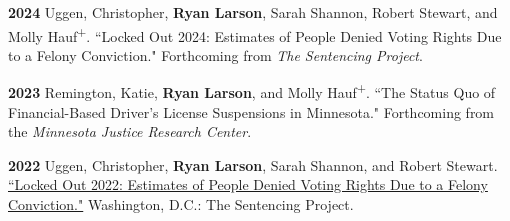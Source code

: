 \documentclass[letterpaper]{article}
\newenvironment{publist}{%
  \begin{list}{}{%
    \setlength{\leftmargin}{0cm}   %
    \setlength{\labelwidth}{2cm}     %
    \setlength{\labelsep}{0.5cm}     %
  }%
}{%
  \end{list}%
}
\renewenvironment{itemize}{
  \begin{list}{}{
    \setlength{\leftmargin}{1.5em}
  }
}{
  \end{list}
}
\begin{document}
\begin{publist}

\item[\textbf{2024}] Uggen, Christopher, \textbf{Ryan Larson}, Sarah Shannon, Robert Stewart, and Molly Hauf\textsuperscript{+}. ``Locked Out 2024: Estimates of People Denied Voting Rights Due to a Felony Conviction." Forthcoming from \textit{The Sentencing Project}.

\item[\textbf{2023}] Remington, Katie, \textbf{Ryan Larson}, and Molly Hauf\textsuperscript{+}. ``The Status Quo of Financial-Based Driver's License Suspensions in Minnesota." Forthcoming from the \textit{Minnesota Justice Research Center}.

\item[\textbf{2022}] Uggen, Christopher, \textbf{Ryan Larson}, Sarah Shannon, and Robert Stewart. \href{https://www.sentencingproject.org/app/uploads/2024/02/Locked-Out-2022-Estimates-of-People-Denied-Voting.pdf}{``Locked Out 2022: Estimates of People Denied Voting Rights Due to a Felony Conviction."} Washington, D.C.: The Sentencing Project.
\begin{itemize}

\end{itemize}
\end{publist}
\end{document}
